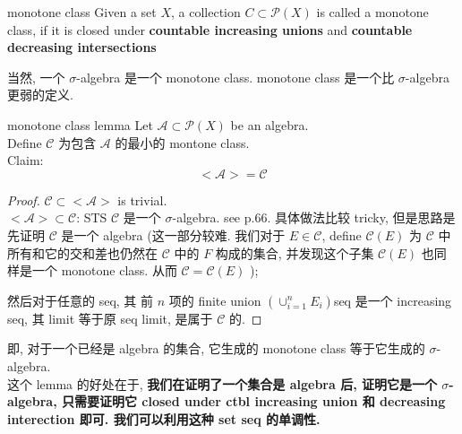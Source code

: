 \documentclass[lang=cn,11pt]{elegantbook}
\begin{document}
\begin{definition}{monotone class}
Given a set $X$, a collection $C \subset \mathcal{P}(X)$ is called a monotone class, if it is closed under \textbf{countable increasing unions} and \textbf{countable decreasing intersections}
\end{definition}
当然, 一个 $\sigma$-algebra 是一个 monotone class. monotone class 是一个比 $\sigma$-algebra 更弱的定义.


\begin{lemma}{monotone class lemma}
Let $\mathcal{A} \subset \mathcal{P}(X)$ be an algebra.\\ 
Define $\mathcal{C}$ 为包含 $\mathcal{A}$ 的最小的 montone class.\\
Claim: \[
<\mathcal{A}> = \mathcal{C}
\]
\end{lemma}
\begin{proof}
    $\mathcal{C} \subset <\mathcal{A}>$ is trivial.\\
    $<\mathcal{A}> \subset \mathcal{C}$: STS $\mathcal{C}$ 是一个 $\sigma$-algebra. see p.66. 具体做法比较 tricky, 但是思路是先证明 $\mathcal{C}$ 是一个 algebra (这一部分较难. 我们对于 $E \in \mathcal{C}$, define $\mathcal{C}(E)$ 为 $\mathcal{C}$ 中所有和它的交和差也仍然在 $\mathcal{C}$ 中的 $F$ 构成的集合, 并发现这个子集 $\mathcal{C}(E)$ 也同样是一个 monotone class. 从而 $\mathcal{C} = \mathcal{C}(E)$ );
    
然后对于任意的 seq, 其 前 $n$ 项的 finite union $(\cup_{i=1}^nE_i)$seq 是一个 increasing seq, 其 limit 等于原 seq limit, 是属于 $\mathcal{C}$ 的.
\end{proof}
\begin{remark}
    即, 对于一个已经是 algebra 的集合, 它生成的 monotone class 等于它生成的 $\sigma$-algebra.\\
    这个 lemma 的好处在于, \textbf{我们在证明了一个集合是 algebra 后, 证明它是一个 $\sigma$-algebra, 只需要证明它 closed under ctbl increasing union 和 decreasing interection 即可. 我们可以利用这种 set seq 的单调性. } 
\end{remark}
\end{document}

